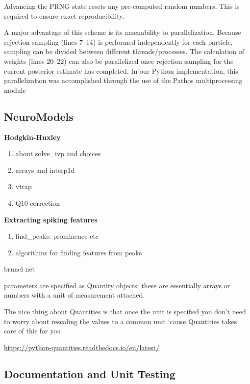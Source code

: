 Advancing the PRNG state resets any pre-computed random numbers. This is required to ensure exact reproducibility.

A major advantage of this scheme is its amenability to parallelization. Because rejection sampling (lines 7–14) is performed independently for each particle, sampling can be divided between different threads/processes. The calculation of weights (lines 20–22) can also be parallelized once rejection sampling for the current posterior estimate has completed. In our Python implementation, this parallelization was accomplished through the use of the Pathos multiprocessing module

\subsection{NeuroModels}

\textbf{Hodgkin-Huxley}

\begin{enumerate}
    \item about solve\_ivp and choices 
    \item arrays and interp1d
    \item vtrap 
    \item Q10 correction
\end{enumerate}

\textbf{Extracting spiking features}

\begin{enumerate}
    \item find\_peaks: prominence etc 
    \item algorithms for finding features from peaks 
\end{enumerate} 

brunel net

parameters are specified as Quantity objects: these are essentially arrays or numbers with a unit of measurement attached.

The nice thing about Quantities is that once the unit is specified you don’t need to worry about rescaling the values to a common unit ‘cause Quantities takes care of this for you

\url{https://python-quantities.readthedocs.io/en/latest/}

\subsection{Documentation and Unit Testing}

